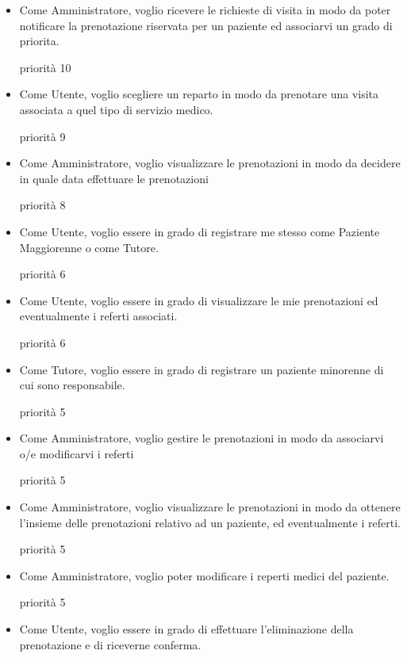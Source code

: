 \begin{itemize}
\item Come Amministratore, voglio ricevere le richieste di visita in modo da
poter notificare la prenotazione riservata per un paziente ed associarvi
un grado di priorita.

\medskip priorità 10
\bigskip

\item Come Utente, voglio scegliere un reparto in modo da prenotare una
visita associata a quel tipo di servizio medico.

\medskip priorità 9
\bigskip

\item Come Amministratore, voglio visualizzare le prenotazioni in modo da
decidere in quale data effettuare le prenotazioni

\medskip priorità 8
\bigskip

\item Come Utente, voglio essere in grado di registrare me stesso come Paziente
Maggiorenne o come Tutore.

\medskip priorità 6
\bigskip

\item Come Utente, voglio essere in grado di visualizzare le mie prenotazioni
ed eventualmente i referti associati.

\medskip priorità 6

\item Come Tutore, voglio essere in grado di registrare un paziente minorenne
di cui sono responsabile.

\medskip priorità 5
\bigskip

\item Come Amministratore, voglio gestire le prenotazioni in modo da associarvi
o/e modificarvi i referti

\medskip priorità 5
\bigskip
 
\item Come Amministratore, voglio visualizzare le prenotazioni in modo da
ottenere l'insieme delle prenotazioni relativo ad un paziente, ed eventualmente
i referti.

\medskip priorità 5
\bigskip

\item Come Amministratore, voglio poter modificare i reperti medici del paziente.

\medskip priorità 5

\item Come Utente, voglio essere in grado di effettuare l'eliminazione della
prenotazione e di riceverne conferma.


\end{itemize}
